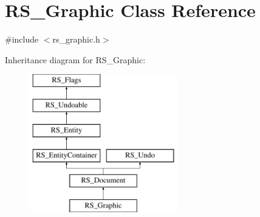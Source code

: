 \hypertarget{classRS__Graphic}{\section{R\-S\-\_\-\-Graphic Class Reference}
\label{classRS__Graphic}
}


{\ttfamily \#include $<$rs\-\_\-graphic.\-h$>$}

Inheritance diagram for R\-S\-\_\-\-Graphic\-:\begin{figure}[H]
\begin{center}
\leavevmode
\includegraphics[height=6.000000cm]{classRS__Graphic}
\end{center}
\end{figure}
